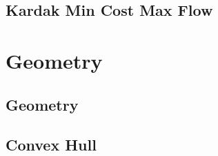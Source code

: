 \documentclass[a4paper,landscape]{article}
\begin{document}
\begin{multicols}{2}
\subsection{Kardak Min Cost Max Flow}
	

\section{Geometry}
\subsection{Geometry}
	
\subsection{Convex Hull}
    

\end{multicols}
\end{document}
